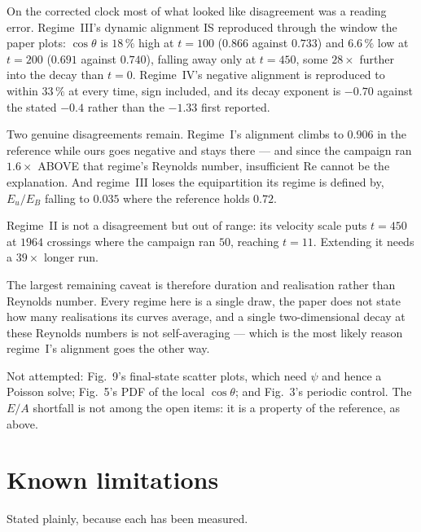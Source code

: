 \documentclass[11pt,a4paper]{article}
\begin{document}
On the corrected clock most of what looked like disagreement was a reading error.
Regime~III's dynamic alignment IS reproduced through the window the paper plots:
$\cos\theta$ is $18\,\%$ high at $t=100$ ($0.866$ against $0.733$) and $6.6\,\%$
low at $t=200$ ($0.691$ against $0.740$), falling away only at $t=450$, some
$28\times$ further into the decay than $t=0$. Regime~IV's negative alignment is
reproduced to within $33\,\%$ at every time, sign included, and its decay exponent
is $-0.70$ against the stated $-0.4$ rather than the $-1.33$ first reported.

Two genuine disagreements remain. Regime~I's alignment climbs to $0.906$ in the
reference while ours goes negative and stays there --- and since the campaign ran
$1.6\times$ ABOVE that regime's Reynolds number, insufficient $\mathrm{Re}$ cannot
be the explanation. And regime~III loses the equipartition its regime is defined
by, $E_u/E_B$ falling to $0.035$ where the reference holds $0.72$.

Regime~II is not a disagreement but out of range: its velocity scale puts $t=450$
at $1964$ crossings where the campaign ran $50$, reaching $t=11$. Extending it
needs a $39\times$ longer run.

The largest remaining caveat is therefore duration and realisation rather than
Reynolds number. Every regime here is a single draw, the paper does not state how
many realisations its curves average, and a single two-dimensional decay at these
Reynolds numbers is not self-averaging --- which is the most likely reason
regime~I's alignment goes the other way.

Not attempted: Fig.~9's final-state scatter plots, which need $\psi$ and hence a
Poisson solve; Fig.~5's PDF of the local $\cos\theta$; and Fig.~3's periodic
control. The $E/A$ shortfall is not among the open items: it is a property of the
reference, as above.

\section{Known limitations}
\label{sec:known}

Stated plainly, because each has been measured.
\end{document}
